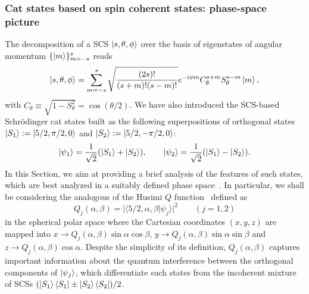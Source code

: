 \subsubsection{Cat states based on spin coherent states: phase-space picture}

The decomposition of a \ac{SCS} $\ket{s,\theta,\phi}$ over the basis of eigenstates of angular momentum $\{\ket{m}\}_{m=-s}^s$ reads
\begin{equation}
	\ket{s,\theta,\phi} =
	\sum^s_{m=-s}
		\sqrt{\frac{(2s)!}{(s+m)!(s-m)!}}
		e^{-i\phi m} C^{s+m}_\theta S^{s-m}_\theta \ket{m},
\end{equation}
with $C_\theta\equiv\sqrt{1-S^2_\theta}=\cos(\theta/2)$. We have also introduced the \ac{SCS}-based Schrödinger cat states built as the following superpositions of orthogonal states $\ket{S_1}:=\ket{5/2,\pi/2,0}$ and $\ket{S_2}:=\ket{5/2,-\pi/2,0}$:
\begin{equation}
\ket{\psi_{1}}=\frac{1}{\sqrt 2}(\ket{S_1}+\ket{S_2}),\qquad\ket{\psi_{2}}=\frac{1}{\sqrt 2}(\ket{S_1}-\ket{S_2}).
\end{equation}
In this Section, we aim at providing a brief analysis of the features of such states, which are best analyzed in a suitably defined phase space~\cite{agarwal1997atomic}. In particular, we shall be considering the analogous of the Husimi $Q$ function~\cite{walls2007quantum} defined as
\begin{equation}
\label{deco}
Q_j(\alpha,\beta)=\vert\langle{5/2,\alpha,\beta}\vert\psi_j\rangle\vert^2\qquad(j=1,2)
\end{equation}
in the spherical polar space where the Cartesian coordinates $(x,y,z)$ are mapped into $x\to Q_j(\alpha,\beta)\sin\alpha\cos\beta$, $y\to Q_j(\alpha,\beta)\sin\alpha\sin\beta$ and $z\to Q_j(\alpha,\beta)\cos\alpha$. Despite the simplicity of its definition, $Q_j(\alpha,\beta)$ captures important information about the quantum interference between the orthogonal components of $\ket{\psi_{j}}$, which differentiate such states from the incoherent mixture of \acp{SCS} $(\ket{S_1}\bra{S_1}\pm\ket{S_2}\bra{S_2})/2$. 

